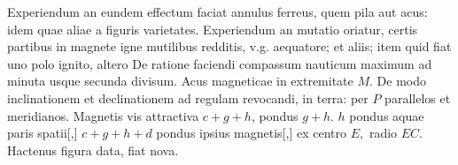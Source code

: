 \pend
\pstart
Experiendum an eundem effectum faciat annulus\protect{} ferreus, quem pila\protect{} aut acus\protect{}: idem quae aliae a figuris varietates. Experiendum an mutatio oriatur, certis partibus in magnete\protect{} 
igne mutilibus redditis, v.g. aequatore\protect{}; et aliis; item quid fiat uno polo\protect{} ignito, altero 
\pend
\pstart
De ratione faciendi compassum\protect{} nauticum maximum ad minuta usque secunda divisum. Acus\protect{} magneticae in extremitate $\displaystyle M.$
\pend
\pstart
De modo inclinationem\protect{} et declinationem\protect{} ad regulam revocandi, in terra\protect{}: per $\displaystyle P$ parallelos et meridianos.
\pend
\pstart
Magnetis\protect{} vis attractiva\protect{} $c+g+h$, pondus\protect{}   $g+h$. $\displaystyle h$ pondus\protect{} aquae\protect{} paris spatii[,] $\displaystyle c+g+h+d$ 
pondus\protect{} ipsius magnetis\protect{}[,] ex centro $\displaystyle E,$ radio $\displaystyle EC.$
Hactenus figura data, fiat nova.
\pend 
